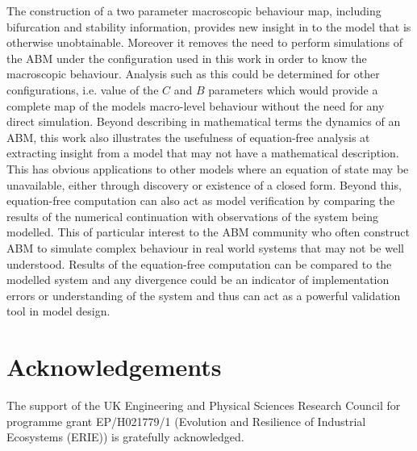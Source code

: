 \documentclass[11pt]{article}
\begin{document}
The construction of a two parameter macroscopic behaviour map, including bifurcation and stability information, provides new insight in to the model that is otherwise unobtainable. Moreover it removes the need to perform simulations of the ABM under the configuration used in this work in order to know the macroscopic behaviour. Analysis such as this could be determined for other configurations, i.e. value of the $C$ and $B$ parameters which would provide a complete map of the models macro-level behaviour without the need for any direct simulation. Beyond describing in mathematical terms the dynamics of an ABM, this work also illustrates the usefulness of equation-free analysis at extracting insight from a model that may not have a mathematical description. This has obvious applications to other models where an equation of state may be unavailable, either through discovery or existence of a closed form. Beyond this, equation-free computation can also act as model verification by comparing the results of the numerical continuation with observations of the system being modelled. This of particular interest to the ABM community who often construct ABM to simulate complex behaviour in real world systems that may not be well understood. Results of the equation-free computation can be compared to the modelled system and any divergence could be an indicator of implementation errors or understanding of the system and thus can act as a powerful validation tool in model design.  



\section*{Acknowledgements}
The support of the UK Engineering and Physical Sciences Research Council for programme grant EP/H021779/1 (Evolution and Resilience of Industrial Ecosystems (ERIE)) is gratefully acknowledged. 




  
\end{document}

